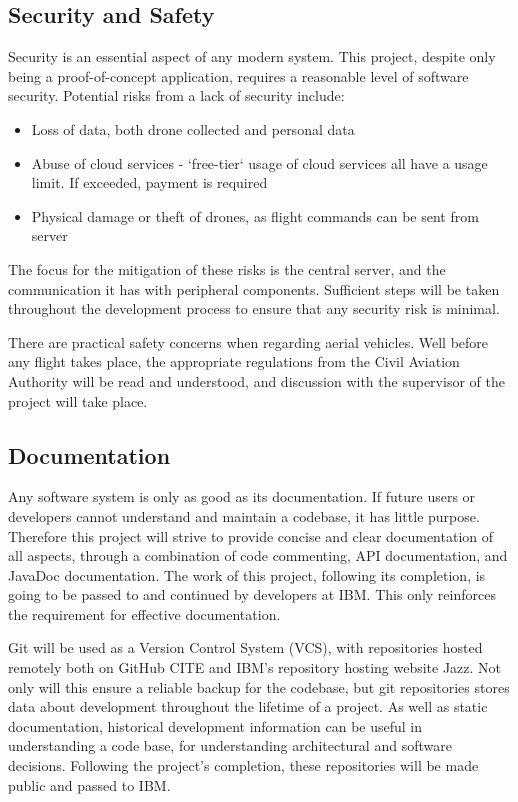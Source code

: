 \documentclass{article}
\begin{document}
\subsection{Security and Safety}
Security is an essential aspect of any modern system. This project, despite only being a proof-of-concept application, requires a reasonable level of software security. Potential risks from a lack of security include:
\begin{itemize}
	\item Loss of data, both drone collected and personal data
	\item Abuse of cloud services - `free-tier` usage of cloud services all have a usage limit. If exceeded, payment is required
	\item Physical damage or theft of drones, as flight commands can be sent from server
\end{itemize}
The focus for the mitigation of these risks is the central server, and the communication it has with peripheral components. Sufficient steps will be taken throughout the development process to ensure that any security risk is minimal.

There are practical safety concerns when regarding aerial vehicles. Well before any flight takes place, the appropriate regulations from the Civil Aviation Authority will be read and understood, and discussion with the supervisor of the project will take place.

\subsection{Documentation}
Any software system is only as good as its documentation. If future users or developers cannot understand and maintain a codebase, it has little purpose. Therefore this project will strive to provide concise and clear documentation of all aspects, through a combination of code commenting, API documentation, and JavaDoc documentation. The work of this project, following its completion, is going to be passed to and continued by developers at IBM. This only reinforces the requirement for effective documentation.

Git will be used as a Version Control System (VCS), with repositories hosted remotely both on GitHub CITE and IBM's repository hosting website Jazz\cite{jazz}. Not only will this ensure a reliable backup for the codebase, but git repositories stores data about development throughout the lifetime of a project. As well as static documentation, historical development information can be useful in understanding a code base, for understanding architectural and software decisions. Following the project's completion, these repositories will be made public and passed to IBM.
\end{document}
